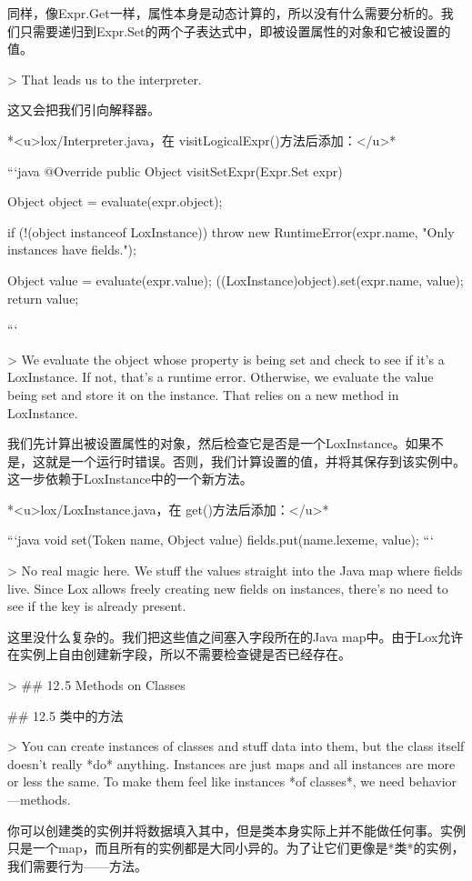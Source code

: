 \documentclass[cn,11pt,chinese]{elegantbook}
\begin{document}
{{{{{{{{{{{{{{{{{{{{同样，像Expr.Get一样，属性本身是动态计算的，所以没有什么需要分析的。我们只需要递归到Expr.Set的两个子表达式中，即被设置属性的对象和它被设置的值。

> That leads us to the interpreter.

这又会把我们引向解释器。

*<u>lox/Interpreter.java，在 visitLogicalExpr()方法后添加：</u>*

```java
  @Override
  public Object visitSetExpr(Expr.Set expr) {
    Object object = evaluate(expr.object);

    if (!(object instanceof LoxInstance)) { 
      throw new RuntimeError(expr.name,
                             "Only instances have fields.");
    }

    Object value = evaluate(expr.value);
    ((LoxInstance)object).set(expr.name, value);
    return value;
  }
```

> We evaluate the object whose property is being set and check to see if it’s a LoxInstance. If not, that’s a runtime error. Otherwise, we evaluate the value being set and store it on the instance. That relies on a new method in LoxInstance.

我们先计算出被设置属性的对象，然后检查它是否是一个LoxInstance。如果不是，这就是一个运行时错误。否则，我们计算设置的值，并将其保存到该实例中。这一步依赖于LoxInstance中的一个新方法。

*<u>lox/LoxInstance.java，在 get()方法后添加：</u>*

```java
  void set(Token name, Object value) {
    fields.put(name.lexeme, value);
  }
```

> No real magic here. We stuff the values straight into the Java map where fields live. Since Lox allows freely creating new fields on instances, there’s no need to see if the key is already present.

这里没什么复杂的。我们把这些值之间塞入字段所在的Java map中。由于Lox允许在实例上自由创建新字段，所以不需要检查键是否已经存在。

> ## 12 . 5 Methods on Classes

## 12.5 类中的方法

> You can create instances of classes and stuff data into them, but the class itself doesn’t really *do* anything. Instances are just maps and all instances are more or less the same. To make them feel like instances *of classes*, we need behavior—methods.

你可以创建类的实例并将数据填入其中，但是类本身实际上并不能做任何事。实例只是一个map，而且所有的实例都是大同小异的。为了让它们更像是*类*的实例，我们需要行为——方法。

}}}}}}}}}}}}}}}}}}}}
\end{document}
